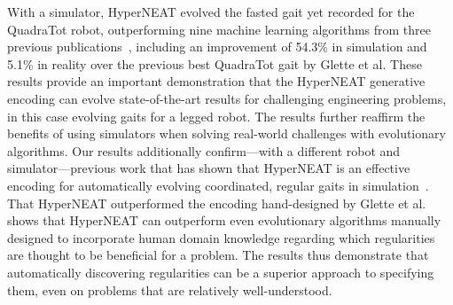 
With a simulator, HyperNEAT evolved the fasted gait yet recorded for the QuadraTot robot, outperforming nine machine learning algorithms from three previous publications~\cite{yos:clune,glette,haocheng}, including an improvement of 54.3\% in simulation and 5.1\% in reality over the previous best QuadraTot gait by Glette et al. These results provide an important demonstration that the HyperNEAT generative encoding can evolve state-of-the-art results for challenging engineering problems, in this case evolving gaits for a legged robot. The results further reaffirm the benefits of using simulators when solving real-world challenges with evolutionary algorithms. Our results additionally confirm---with a different robot and simulator---previous work that has shown that HyperNEAT is an effective encoding for automatically evolving coordinated, regular gaits in simulation~\cite{clune2009evolving,clune2011performance,yos:clune}. That HyperNEAT outperformed the encoding hand-designed by Glette et al. shows that HyperNEAT can outperform even evolutionary algorithms manually designed to incorporate human domain knowledge regarding which regularities are thought to be beneficial for a problem. The results thus demonstrate that automatically discovering regularities can be a superior approach to specifying them, even on problems that are relatively well-understood. 
